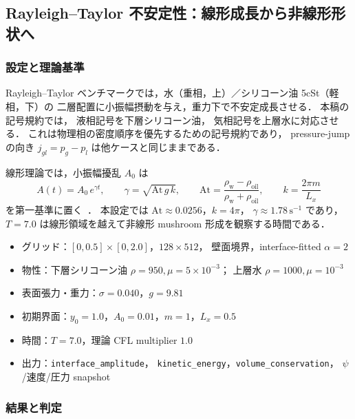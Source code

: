 \subsection{Rayleigh--Taylor 不安定性：線形成長から非線形形状へ}
\label{sec:val_rayleigh_taylor}

\subsubsection{設定と理論基準}

Rayleigh--Taylor ベンチマークでは，水（重相，上）／シリコーン油 5cSt（軽相，下）の
二層配置に小振幅摂動を与え，重力下で不安定成長させる．
本稿の記号規約では，
液相記号を下層シリコーン油，
気相記号を上層水に対応させる．
これは物理相の密度順序を優先するための記号規約であり，
pressure-jump の向き $j_{gl}=p_g-p_l$ は他ケースと同じままである．

線形理論では，小振幅擾乱 $A_0$ は
\begin{equation}
  A(t) = A_0 \, e^{\gamma t},
  \qquad
  \gamma = \sqrt{\mathrm{At}\, g\, k},
  \qquad
  \mathrm{At} = \frac{\rho_{\text{w}}-\rho_{\text{oil}}}{\rho_{\text{w}}+\rho_{\text{oil}}},
  \qquad
  k = \frac{2\pi m}{L_x}
  \label{eq:rt_linear_growth}
\end{equation}
を第一基準に置く~\cite{Chandrasekhar1961}．
本設定では
$\mathrm{At}\approx0.0256$，$k=4\pi$，
$\gamma\approx1.78\,\mathrm{s^{-1}}$ であり，
$T=7.0$ は線形領域を越えて非線形 mushroom 形成を観察する時間である．

\begin{itemize}[noitemsep,leftmargin=2em]
  \item グリッド：$[0,0.5]\times[0,2.0]$，$128\times512$，
        壁面境界，interface-fitted $\alpha=2$
  \item 物性：下層シリコーン油 $\rho=950,\mu=5\times10^{-3}$；
        上層水 $\rho=1000,\mu=10^{-3}$
  \item 表面張力・重力：$\sigma=0.040$，$g=9.81$
  \item 初期界面：$y_0=1.0$，$A_0=0.01$，$m=1$，$L_x=0.5$
  \item 時間：$T=7.0$，理論 CFL multiplier $1.0$
  \item 出力：\texttt{interface\_amplitude}，
        \texttt{kinetic\_energy}，\texttt{volume\_conservation}，
        $\psi$/速度/圧力 snapshot
\end{itemize}

\subsubsection{結果と判定}

